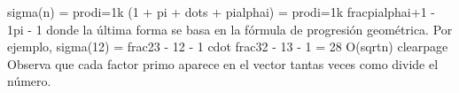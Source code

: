 {}\markdownRendererBackslash{}sigma(n) = \markdownRendererBackslash{}prod\markdownRendererUnderscore{}\markdownRendererLeftBrace{}i=1\markdownRendererRightBrace{}\markdownRendererCircumflex{}\markdownRendererLeftBrace{}k\markdownRendererRightBrace{} (1 + p\markdownRendererUnderscore{}i + \markdownRendererBackslash{}dots + p\markdownRendererUnderscore{}i\markdownRendererCircumflex{}\markdownRendererLeftBrace{}\markdownRendererBackslash{}alpha\markdownRendererUnderscore{}i\markdownRendererRightBrace{}) = \markdownRendererBackslash{}prod\markdownRendererUnderscore{}\markdownRendererLeftBrace{}i=1\markdownRendererRightBrace{}\markdownRendererCircumflex{}\markdownRendererLeftBrace{}k\markdownRendererRightBrace{} \markdownRendererBackslash{}frac\markdownRendererLeftBrace{}p\markdownRendererUnderscore{}i\markdownRendererCircumflex{}\markdownRendererLeftBrace{}\markdownRendererBackslash{}alpha\markdownRendererUnderscore{}i+1\markdownRendererRightBrace{} - 1\markdownRendererRightBrace{}\markdownRendererLeftBrace{}p\markdownRendererUnderscore{}i - 1\markdownRendererRightBrace{}\markdownRendererSoftLineBreak
{}\markdownRendererDollarSign{}\markdownRendererDollarSign{}\markdownRendererParagraphSeparator
{}donde la última forma se basa en la fórmula de progresión geométrica.\markdownRendererSoftLineBreak
{}Por ejemplo, \markdownRendererDollarSign{} \markdownRendererBackslash{}sigma(12) = \markdownRendererBackslash{}frac\markdownRendererLeftBrace{}2\markdownRendererCircumflex{}3 - 1\markdownRendererRightBrace{}\markdownRendererLeftBrace{}2 - 1\markdownRendererRightBrace{} \markdownRendererBackslash{}cdot \markdownRendererBackslash{}frac\markdownRendererLeftBrace{}3\markdownRendererCircumflex{}2 - 1\markdownRendererRightBrace{}\markdownRendererLeftBrace{}3 - 1\markdownRendererRightBrace{} = 28\markdownRendererDollarSign{}\markdownRendererParagraphSeparator
{} \markdownRendererDollarSign{}O(\markdownRendererBackslash{}sqrt\markdownRendererLeftBrace{}n\markdownRendererRightBrace{})\markdownRendererDollarSign{}\markdownRendererInterblockSeparator
{}\markdownRendererInterblockSeparator
{}\markdownRendererDollarSign{}\markdownRendererBackslash{}clearpage\markdownRendererDollarSign{}\markdownRendererInterblockSeparator
{}\markdownRendererSectionBegin
{}\markdownRendererInterblockSeparator
{}Observa que cada factor primo aparece en el vector tantas veces como divide el número.\markdownRendererParagraphSeparator
